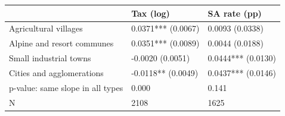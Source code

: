 \begin{tabular}{lll}
\toprule
 & Tax (log) & SA rate (pp) \\
\midrule
Agricultural villages & 0.0371*** (0.0067) & 0.0093 (0.0338) \\
Alpine and resort communes & 0.0351*** (0.0089) & 0.0044 (0.0188) \\
Small industrial towns & -0.0020 (0.0051) & 0.0444*** (0.0130) \\
Cities and agglomerations & -0.0118** (0.0049) & 0.0437*** (0.0146) \\
p-value: same slope in all types & 0.000 & 0.141 \\
N & 2108 & 1625 \\
\bottomrule
\end{tabular}
